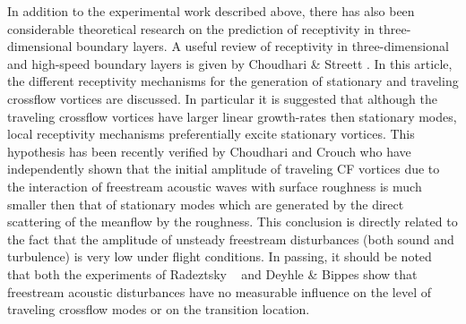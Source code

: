 %
%
In addition to the experimental work described above, there has also been
considerable theoretical research on the prediction of receptivity in
three-dimensional boundary layers.  A useful review of receptivity in
three-dimensional and high-speed boundary layers is given by Choudhari \&
Streett \cite{ChSt:90}.  In this article, the different receptivity mechanisms
for the generation of stationary and traveling crossflow vortices are
discussed.  In particular it is suggested that although the traveling
crossflow vortices have larger linear growth-rates then stationary modes,
local receptivity mechanisms preferentially excite stationary vortices.  This
hypothesis has been recently verified by Choudhari \cite{Choudhari:94} and
Crouch \cite{Crouch:93} who have independently shown that the initial
amplitude of traveling CF vortices due to the interaction of freestream
acoustic waves with surface roughness is much smaller then that of stationary
modes which are generated by the direct scattering of the meanflow by the
roughness.  This conclusion is directly related to the fact that the amplitude
of unsteady freestream disturbances (both sound and turbulence) is very low
under flight conditions.  In passing, it should be noted that both the
experiments of Radeztsky \etal\ \cite{RaReSa:93} and Deyhle \& Bippes
\cite{DeBi:96} show that freestream acoustic disturbances have no measurable
influence on the level of traveling crossflow modes or on the transition
location.

